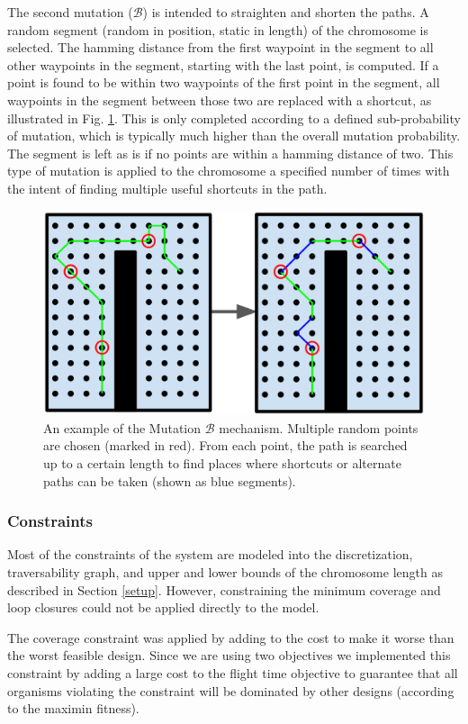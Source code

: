 \documentclass[letterpaper, 10 pt, conference]{ieeeconf}  %
\begin{document}
The second mutation ($\mathcal{B}$) is intended to straighten and shorten the paths. A random segment (random in position, static in length) of the chromosome is selected. The hamming distance from the first waypoint in the segment to all other waypoints in the segment, starting with the last point, is computed. If a point is found to be within two waypoints of the first point in the segment, all waypoints in the segment between those two are replaced with a shortcut, as illustrated in Fig. \ref{fig:muterpolation}. This is only completed according to a defined sub-probability of mutation, which is typically much higher than the overall mutation probability. The segment is left as is if no points are within a hamming distance of two. This type of mutation is applied to the chromosome a specified number of times with the intent of finding multiple useful shortcuts in the path.

\begin{figure}
\centering
\includegraphics[width=0.8\linewidth]{figures/muterpolation.png}
\caption{An example of the Mutation $\mathcal{B}$ mechanism. Multiple random points are chosen (marked in red). From each point, the path is searched up to a certain length to find places where shortcuts or alternate paths can be taken (shown as blue segments).}
\label{fig:muterpolation}
\end{figure}

\subsubsection{Constraints}\label{constraints}

Most of the constraints of the system are modeled into the discretization, traversability graph, and upper and lower bounds of the chromosome length as described in Section \ref{setup}. However, constraining the minimum coverage and loop closures could not be applied directly to the model.

The coverage constraint was applied by adding to the cost to make it worse than the worst feasible design. Since we are using two objectives we implemented this constraint by adding a large cost to the flight time objective to guarantee that all organisms violating the constraint will be dominated by other designs (according to the maximin fitness).
\end{document}
